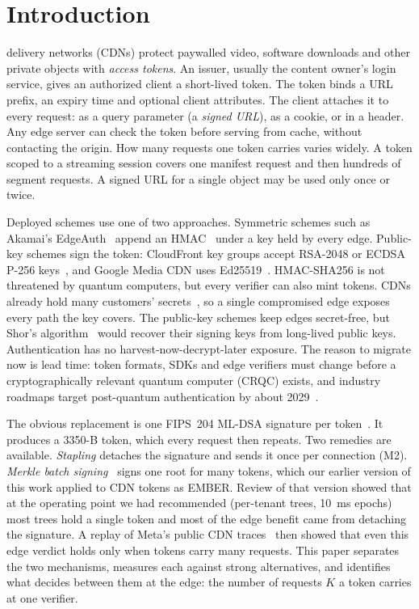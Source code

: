 \section{Introduction}
\label{sec:intro}

 delivery networks (CDNs) protect paywalled video, software downloads and other private objects with \emph{access tokens}. An issuer, usually the content owner's login service, gives an authorized client a short-lived token. The token binds a URL prefix, an expiry time and optional client attributes. The client attaches it to every request: as a query parameter (a \emph{signed URL}), as a cookie, or in a header. Any edge server can check the token before serving from cache, without contacting the origin. How many requests one token carries varies widely. A token scoped to a streaming session covers one manifest request and then hundreds of segment requests. A signed URL for a single object may be used only once or twice.

Deployed schemes use one of two approaches. Symmetric schemes such as Akamai's EdgeAuth~\cite{akamai-edgeauth} append an HMAC~\cite{rfc2104} under a key held by every edge. Public-key schemes sign the token: CloudFront key groups accept RSA-2048 or ECDSA P-256 keys~\cite{cloudfront-signers}, and Google Media CDN uses Ed25519~\cite{mediacdn-sig}. HMAC-SHA256 is not threatened by quantum computers, but every verifier can also mint tokens. CDNs already hold many customers' secrets~\cite{liang2014httpscdn,cangialosi2016keysharing}, so a single compromised edge exposes every path the key covers. The public-key schemes keep edges secret-free, but Shor's algorithm~\cite{shor1997} would recover their signing keys from long-lived public keys. Authentication has no harvest-now-decrypt-later exposure. The reason to migrate now is lead time: token formats, SDKs and edge verifiers must change before a cryptographically relevant quantum computer (CRQC) exists, and industry roadmaps target post-quantum authentication by about 2029~\cite{cf2026roadmap}.

The obvious replacement is one FIPS~204 ML-DSA signature per token~\cite{fips204,rfc9964}. It produces a \num{3350}-B token, which every request then repeats. Two remedies are available. \emph{Stapling} detaches the signature and sends it once per connection (M2). \emph{Merkle batch signing}~\cite{merkle1989,batchsig2024,fregly2023mtl} signs one root for many tokens, which our earlier version of this work applied to CDN tokens as EMBER. Review of that version showed that at the operating point we had recommended (per-tenant trees, 10~ms epochs) most trees hold a single token and most of the edge benefit came from detaching the signature. A replay of Meta's public CDN traces~\cite{berg2020cachelib,cachelib-traces} then showed that even this edge verdict holds only when tokens carry many requests. This paper separates the two mechanisms, measures each against strong alternatives, and identifies what decides between them at the edge: the number of requests $K$ a token carries at one verifier.

